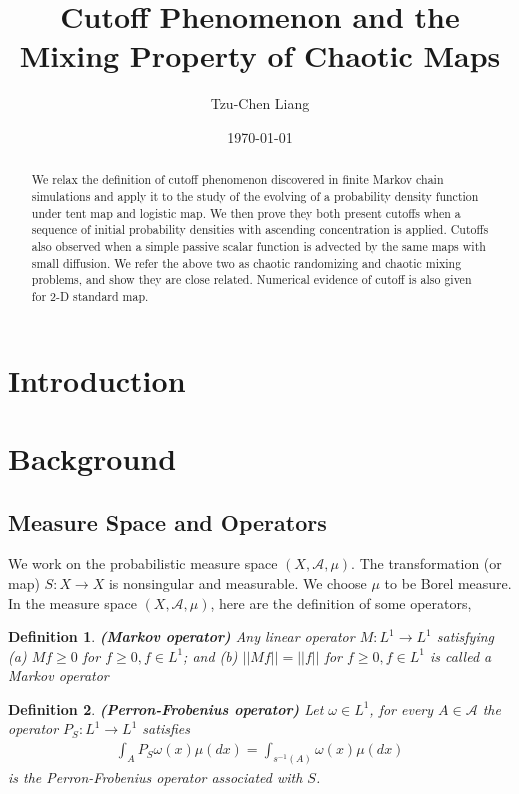 \documentclass{article}
\title{Cutoff Phenomenon  and the Mixing Property of Chaotic Maps}
\author{Tzu-Chen Liang}
\date{\today}
\newtheorem{definition}{Definition}
\begin{document}
\maketitle
\begin{abstract}
We relax the definition of cutoff phenomenon discovered in finite Markov chain simulations and apply it to the study of the evolving of a probability density function under tent map and logistic map. We then prove they both present cutoffs when a sequence of initial probability densities with ascending concentration is applied. Cutoffs also observed when a simple passive scalar function is advected by the same maps with small diffusion. We refer the above two as chaotic randomizing and chaotic mixing problems, and show they are close related. Numerical evidence of cutoff is also given for 2-D standard map. 
 
\end{abstract}
\section{Introduction}


\section{Background}


\subsection{Measure Space and Operators}
We work on the probabilistic measure space $(X,\mathcal{A},\mu)$. The transformation (or map) $S: X \rightarrow X$ is nonsingular and measurable. We choose $\mu$ to be Borel measure. In the measure space $(X,\mathcal{A},\mu)$, here are the definition of some operators,
\begin{definition} {\bfseries (Markov operator)}
Any linear operator $M:L^1 \rightarrow L^1$ satisfying 
(a) $Mf \ge 0$ for $f\ge 0, f \in L^1$; and  
(b) $||Mf|| = ||f||$ for $f\ge 0, f \in L^1$
is called a Markov operator
\end{definition} 

\begin{definition} {\bfseries (Perron-Frobenius operator)}
Let $\omega \in L^1$, for every $A \in \mathcal{A}$ the operator $P_S:L^1 \rightarrow L^1$ satisfies
  \begin{eqnarray}
    \int_A P_S \omega(x)\mu(dx) = \int_{s^{-1}(A)} \omega(x)\mu(dx)
  \end{eqnarray}
is the Perron-Frobenius operator associated with $S$.
\end{definition} 
\end{document}
